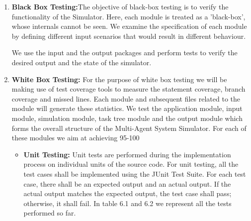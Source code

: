 \begin{enumerate}

\item \textbf{Black Box Testing:}The objective of black-box testing is to verify the functionality of the Simulator. Here, each module is treated as a 'black-box', whose internals cannot be seen. We examine the specification of each module by defining different
input scenarios that would result in different behaviour.

We use the input and the output packages and perform tests to verify the desired output and the state of the simulator.

\item \textbf{White Box Testing:} For the purpose of white box testing we will be making use of test coverage tools to measure the statement coverage, branch coverage and missed lines. Each module and subsequent files related to the module will generate these statistics. We test the application module, input module, simulation module, task tree module and the output module which forms the overall structure of the Multi-Agent System Simulator. For each of these modules we aim at achieving 95-100%

\begin{itemize}
\item \textbf{Unit Testing:} Unit tests are performed during the implementation process on individual units of the source code. For unit testing, all the test cases shall be implemented using the JUnit Test Suite. For each test case, there shall be an expected output and an actual output. If the actual output matches the expected output, the test case shall pass; otherwise, it shall fail. In table 6.1 and 6.2 we represent all the tests performed so far.


\end{itemize}
\end{enumerate}

